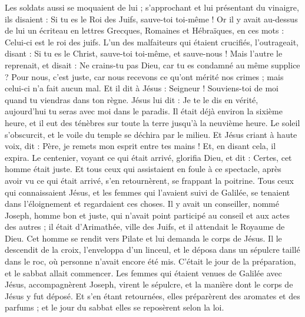 \begin{multicols}{2}
Les soldats aussi se moquaient de lui ; s'approchant et lui présentant du vinaigre,
ils disaient : Si tu es le Roi des Juifs, sauve-toi toi-même !
Or il y avait au-dessus de lui un écriteau en lettres Grecques, Romaines et Hébraïques, en ces mots : Celui-ci est le roi des juifs.
L'un des malfaiteurs qui étaient crucifiés, l'outrageait, disant : Si tu es le Christ, sauve-toi toi-même, et sauve-nous !
Mais l'autre le reprenait, et disait : Ne crains-tu pas Dieu, car tu es condamné au même supplice ?
Pour nous, c'est juste, car nous recevons ce qu'ont mérité nos crimes ; mais celui-ci n'a fait aucun mal.
Et il dit à Jésus : Seigneur ! Souviens-toi de moi quand tu viendras dans ton règne.
Jésus lui dit : Je te le dis en vérité, aujourd'hui tu seras avec moi dans le paradis.
Il était déjà environ la sixième heure, et il eut des ténèbres sur toute la terre jusqu'à la neuvième heure.
Le soleil s'obscurcit, et le voile du temple se déchira par le milieu.
Et Jésus criant à haute voix, dit : Père, je remets mon esprit entre tes mains ! Et, en disant cela, il expira.
Le centenier, voyant ce qui était arrivé, glorifia Dieu, et dit : Certes, cet homme était juste.
Et tous ceux qui assistaient en foule à ce spectacle, après avoir vu ce qui était arrivé, s'en retournèrent, se frappant la poitrine.
Tous ceux qui connaissaient Jésus, et les femmes qui l'avaient suivi de Galilée, se tenaient dans l'éloignement et regardaient ces choses.
Il y avait un conseiller, nommé Joseph, homme bon et juste,
qui n'avait point participé au conseil et aux actes des autres ; il était d'Arimathée, ville des Juifs, et il attendait le Royaume de Dieu.
Cet homme se rendit vers Pilate et lui demanda le corps de Jésus.
Il le descendit de la croix, l'enveloppa d'un linceul, et le déposa dans un sépulcre taillé dans le roc, où personne n'avait encore été mis.
C'était le jour de la préparation, et le sabbat allait commencer.
Les femmes qui étaient venues de Galilée avec Jésus, accompagnèrent Joseph, virent le sépulcre, et la manière dont le corps de Jésus y fut déposé.
Et s'en étant retournées, elles préparèrent des aromates et des parfums ; et le jour du sabbat elles se reposèrent selon la loi.

\end{multicols}
